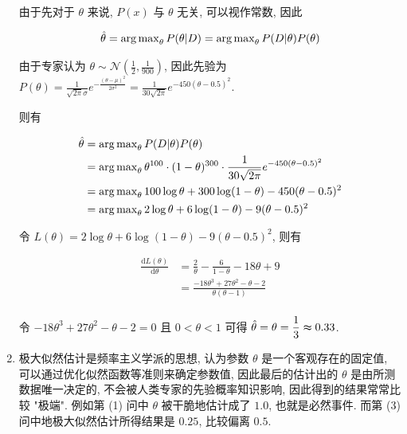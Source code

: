 \documentclass[answers]{exam}  %
\begin{document}
\begin{questions}
\begin{solution}
\begin{enumerate}
            由于先对于 $\theta$ 来说, $P(x)$ 与 $\theta$ 无关, 可以视作常数, 因此

            $$
              \hat{\theta} = \operatorname{arg\,max}_{\theta} P(\theta|D) = \operatorname{arg\,max}_{\theta} P(D|\theta)P(\theta)
            $$

            由于专家认为 $\displaystyle \theta \sim \mathcal{N}(\frac{1}{2}, \frac{1}{900})$, 因此先验为 $\displaystyle P(\theta) = \frac{1}{\sqrt{2\pi}\sigma}e^{-\frac{(\theta-\mu)^{2}}{2\sigma^{2}}} = \frac{1}{30\sqrt{2\pi}}e^{-450(\theta-0.5)^{2}}$.

            则有

            $$
              \begin{aligned}
                \hat{\theta} & = \operatorname{arg\,max}_{\theta} P(D|\theta)P(\theta)                                                                      \\
                             & = \operatorname{arg\,max}_{\theta} \theta^{100} \cdot (1-\theta)^{300} \cdot \frac{1}{30\sqrt{2\pi}}e^{-450(\theta-0.5)^{2}} \\
                             & = \operatorname{arg\,max}_{\theta} 100\log\theta + 300\log(1-\theta) -450(\theta-0.5)^{2}                                    \\
                             & = \operatorname{arg\,max}_{\theta} 2\log\theta + 6\log(1-\theta) -9(\theta-0.5)^{2}                                          \\
              \end{aligned}
            $$

            令 $L(\theta) = 2\log\theta + 6\log(1-\theta) -9(\theta-0.5)^{2}$, 则有

            $$
              \begin{aligned}
                \frac{\mathrm{d}L(\theta)}{\mathrm{d}\theta}
                 & = \frac{2}{\theta} - \frac{6}{1-\theta} - 18\theta + 9                     \\
                 & = \frac{- 18 \theta^{3} + 27 \theta^{2} - \theta - 2}{\theta (\theta - 1)} \\
              \end{aligned}
            $$

            令 $\displaystyle - 18 \theta^{3} + 27 \theta^{2} - \theta - 2 = 0$ 且 $0 < \theta < 1$ 可得 $\displaystyle \hat{\theta} = \theta = \frac{1}{3} \thickapprox 0.33$.

      \item

            极大似然估计是频率主义学派的思想, 认为参数 $\theta$ 是一个客观存在的固定值, 可以通过优化似然函数等准则来确定参数值, 因此最后的估计出的 $\theta$ 是由所测数据唯一决定的, 不会被人类专家的先验概率知识影响, 因此得到的结果常常比较 "极端". 例如第 (1) 问中 $\theta$ 被干脆地估计成了 $1.0$, 也就是必然事件. 而第 (3) 问中地极大似然估计所得结果是 $0.25$, 比较偏离 $0.5$.


\end{enumerate}
\end{solution}
\end{questions}
\end{document}

